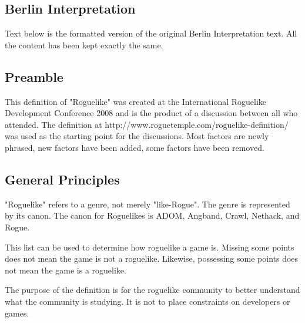 \documentclass{article}
\begin{document}
\subsection{Berlin Interpretation}

Text below is the formatted version of the original Berlin Interpretation text. All the content has been kept exactly the same.

\subsection*{Preamble}

This definition of "Roguelike" was created at the International 
Roguelike Development Conference 2008 and is the product of a 
discussion between all who attended. The definition at 
http://www.roguetemple.com/roguelike-definition/ was used as the 
starting point for the discussions. Most factors are newly phrased, 
new factors have been added, some factors have been removed.

\subsection*{General Principles}
 
"Roguelike" refers to a genre, not merely "like-Rogue". The genre is 
represented by its canon. The canon for Roguelikes is ADOM, Angband, 
Crawl, Nethack, and Rogue. 
 
This list can be used to determine how roguelike a game is. Missing 
some points does not mean the game is not a roguelike. Likewise, 
possessing some points does not mean the game is a roguelike.  
 
The purpose of the definition is for the roguelike community to better 
understand what the community is studying. It is not to place 
constraints on developers or games. 
\end{document}
